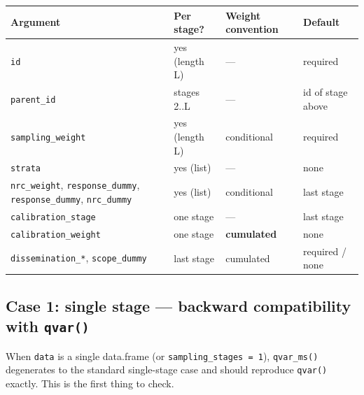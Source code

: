 \documentclass[
]{article}
\newcounter{none} %
\begin{document}
{\def\LTcaptype{none} %
\begin{longtable}[]{@{}
  >{\raggedright\arraybackslash}p{}
  >{\raggedright\arraybackslash}p{}
  >{\raggedright\arraybackslash}p{}
  >{\raggedright\arraybackslash}p{}@{}}
\toprule\noalign{}
\begin{minipage}[b]{\linewidth}\raggedright
Argument
\end{minipage} & \begin{minipage}[b]{\linewidth}\raggedright
Per stage?
\end{minipage} & \begin{minipage}[b]{\linewidth}\raggedright
Weight convention
\end{minipage} & \begin{minipage}[b]{\linewidth}\raggedright
Default
\end{minipage} \\
\midrule\noalign{}
\endhead
\bottomrule\noalign{}
\endlastfoot
\texttt{id} & yes (length L) & --- & required \\
\texttt{parent\_id} & stages 2..L & --- & id of stage above \\
\texttt{sampling\_weight} & yes (length L) & conditional & required \\
\texttt{strata} & yes (list) & --- & none \\
\texttt{nrc\_weight}, \texttt{response\_dummy},
\texttt{response\_dummy}, \texttt{nrc\_dummy} & yes (list) & conditional
& last stage \\
\texttt{calibration\_stage} & one stage & --- & last stage \\
\texttt{calibration\_weight} & one stage & \textbf{cumulated} & none \\
\texttt{dissemination\_*}, \texttt{scope\_dummy} & last stage &
cumulated & required / none \\
\end{longtable}
}

\subsection{\texorpdfstring{Case 1: single stage --- backward
compatibility with
\texttt{qvar()}}{Case 1: single stage --- backward compatibility with qvar()}}\label{case-1-single-stage-backward-compatibility-with-qvar}

When \texttt{data} is a single data.frame (or
\texttt{sampling\_stages\ =\ 1}), \texttt{qvar\_ms()} degenerates to the
standard single-stage case and should reproduce \texttt{qvar()} exactly.
This is the first thing to check.
\end{document}
